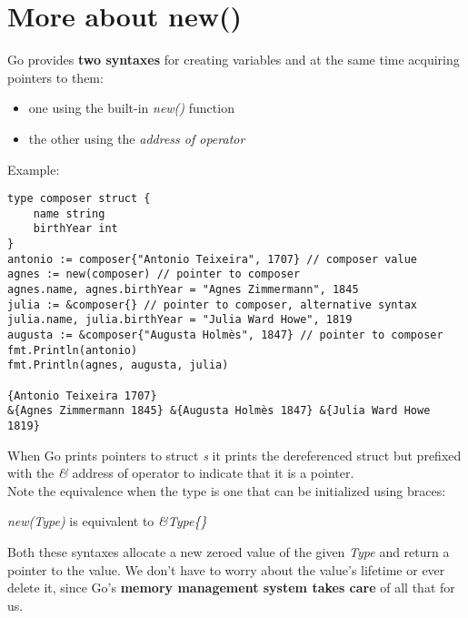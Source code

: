 \documentclass[10pt,letterpaper]{report}
\begin{document}
\section{More about new()}
Go provides \textbf{two syntaxes} for creating variables and at the same time acquiring pointers to them:
\begin{itemize}
\item one using the built-in \textit{new()} function
\item the other using the \textit{address of operator}
\end{itemize}
Example:
\begin{lstlisting}
type composer struct {
	name string
	birthYear int
}
antonio := composer{"Antonio Teixeira", 1707} // composer value
agnes := new(composer) // pointer to composer
agnes.name, agnes.birthYear = "Agnes Zimmermann", 1845
julia := &composer{} // pointer to composer, alternative syntax
julia.name, julia.birthYear = "Julia Ward Howe", 1819
augusta := &composer{"Augusta Holmès", 1847} // pointer to composer
fmt.Println(antonio)
fmt.Println(agnes, augusta, julia)

{Antonio Teixeira 1707}
&{Agnes Zimmermann 1845} &{Augusta Holmès 1847} &{Julia Ward Howe 1819}
\end{lstlisting}
When Go prints pointers to struct \textit{s} it prints the dereferenced struct but prefixed with the \textit{\&} address of operator to indicate that it is a pointer.\\
Note the equivalence when the type is one that can be initialized using braces:\\
\begin{center}
\textit{new(Type)} is equivalent to  \textit{\&Type\{\}}
\end{center}
Both these syntaxes allocate a new zeroed value of the given \textit{Type} and return a pointer to the value. We don't have to worry about the value's lifetime or ever delete it, since Go's \textbf{memory management system takes care} of all that for us.
\end{document}
